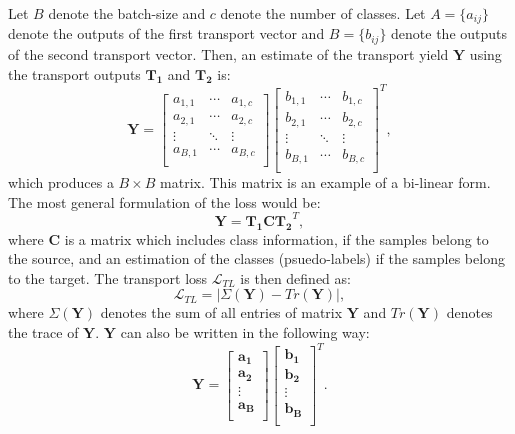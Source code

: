\documentclass[10pt,twocolumn,letterpaper]{article}
\begin{document}
Let $B$ denote the batch-size and $c$ denote the number of classes. Let $A = \{a_{ij}\}$ denote the outputs of the first transport vector and $B = \{b_{ij}\}$ denote the outputs of the second transport vector. Then, an estimate of the transport yield $\mathbf{Y}$ using the transport outputs $\mathbf{T_1}$ and $\mathbf{T_2}$ is:
\begin{equation}
\mathbf{Y} = 
\left[\begin{array}{ccc}
a_{1,1} & \cdots  & a_{1,c} \\
a_{2,1} & \cdots & a_{2,c} \\
\vdots  & \ddots & \vdots \\
a_{B,1}  & \cdots & a_{B,c} \\
\end{array}\right]
\left[\begin{array}{ccc}
b_{1,1} & \cdots  & b_{1,c} \\
b_{2,1} & \cdots & b_{2,c} \\
\vdots  & \ddots & \vdots \\
b_{B,1}  & \cdots & b_{B,c} \\
\end{array}\right]^T ,
\end{equation}
which produces a $B \times B$ matrix. This matrix is an example of a bi-linear form. The most general formulation of the loss would be: 
\begin{equation}
    \mathbf{Y} = \mathbf{T_1} \mathbf{C} \mathbf{T_2}^T ,
\end{equation}
where $\mathbf{C}$ is a matrix which includes class information, if the samples belong to the source, and an estimation of the classes (psuedo-labels) if the samples belong to the target. The transport loss $\mathcal{L}_{TL}$ is then defined as: 
\begin{equation}
    \mathcal{L}_{TL} = | \Sigma(\mathbf{Y}) - Tr(\mathbf{Y}) |  ,
\end{equation}
where $\Sigma(\mathbf{Y})$  denotes the sum of all entries of matrix $\mathbf{Y}$ and  $Tr(\mathbf{Y})$ denotes the trace of $\mathbf{Y}$.  $\mathbf{Y}$ can also be written in the following way:\
\begin{equation}
\mathbf{Y} = 
\left[\begin{array}{c}
\mathbf{a_1} \\
\mathbf{a_2}  \\
\vdots  \\
\mathbf{a_B}  \\
\end{array}\right]
\left[\begin{array}{c}
\mathbf{b_1} \\
\mathbf{b_2}  \\
\vdots  \\
\mathbf{b_B}  \\
\end{array}\right]^T .
\end{equation}
\end{document}

